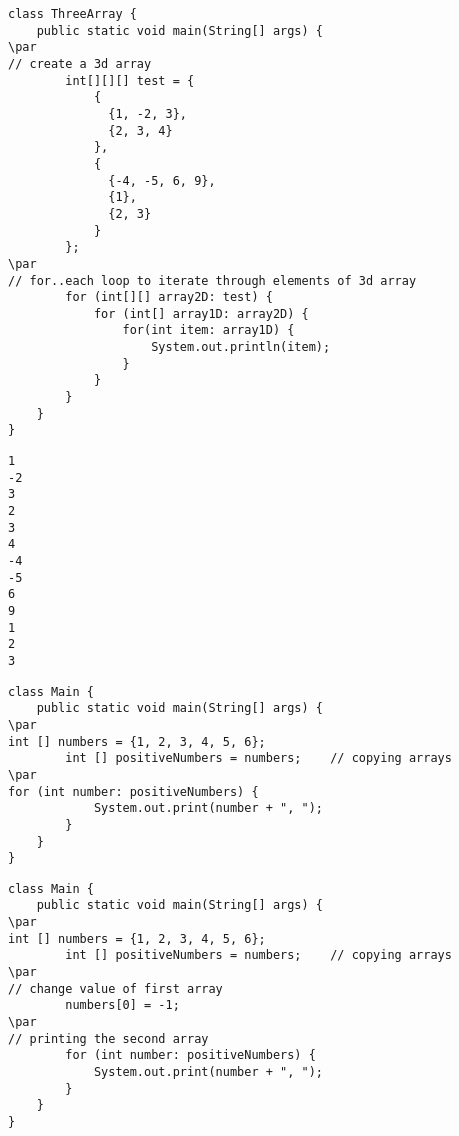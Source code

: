 \documentclass{book}
\def\lthtmlcheckvsize{\ifdim\ht\sizebox<\vsize 
  \ifdim\wd\sizebox<\hsize\expandafter\hfill\fi \expandafter\vfill
  \else\expandafter\vss\fi}%
\begin{document}
{\newpage\clearpage
{}%
\begin{lstlisting}
class ThreeArray {
    public static void main(String[] args) {
\par
// create a 3d array
        int[][][] test = {
            {
              {1, -2, 3}, 
              {2, 3, 4}
            }, 
            { 
              {-4, -5, 6, 9}, 
              {1}, 
              {2, 3}
            } 
        };
\par
// for..each loop to iterate through elements of 3d array
        for (int[][] array2D: test) {
            for (int[] array1D: array2D) {
                for(int item: array1D) {
                    System.out.println(item);
                }
            }
        }
    }
}
\end{lstlisting}%
\lthtmlfigureZ
\lthtmlcheckvsize\clearpage}

{\newpage\clearpage
{}%
\begin{lstlisting}
1
-2
3
2
3
4
-4
-5
6
9
1
2
3
\end{lstlisting}%
\lthtmlfigureZ
\lthtmlcheckvsize\clearpage}

{\newpage\clearpage
{}%
\begin{lstlisting}
class Main {
    public static void main(String[] args) {
\par
int [] numbers = {1, 2, 3, 4, 5, 6};
        int [] positiveNumbers = numbers;    // copying arrays
\par
for (int number: positiveNumbers) {
            System.out.print(number + ", ");
        }
    }
}
\end{lstlisting}%
\lthtmlfigureZ
\lthtmlcheckvsize\clearpage}

{\newpage\clearpage
{}%
\begin{lstlisting}
class Main {
    public static void main(String[] args) {
\par
int [] numbers = {1, 2, 3, 4, 5, 6};
        int [] positiveNumbers = numbers;    // copying arrays
\par
// change value of first array
        numbers[0] = -1;
\par
// printing the second array
        for (int number: positiveNumbers) {
            System.out.print(number + ", ");
        }
    }
}
\end{lstlisting}%
\lthtmlfigureZ
\lthtmlcheckvsize\clearpage}
\end{document}
